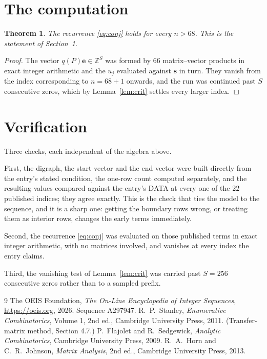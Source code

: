 \documentclass[11pt,a4paper]{article}
\theoremstyle{plain}
\newtheorem{theorem}{Theorem}
\theoremstyle{definition}
\begin{document}
\section{The computation}

\begin{theorem}
The recurrence \eqref{eq:conj} holds for every $n>68$. This is the statement of
Section~1.
\end{theorem}

\begin{proof}
The vector $q(P)\mathbf{e}\in\mathbb{Z}^{S}$ was formed by $66$ matrix--vector
products in exact integer arithmetic and the $u_j$ evaluated against $\mathbf{s}$ in turn.
They vanish from the index corresponding to $n=68+1$ onwards, and the run was continued
past $S$ consecutive zeros, which by Lemma~\ref{lem:crit} settles every larger index.
\end{proof}

\section{Verification}

Three checks, each independent of the algebra above.

First, the digraph, the start vector and the end vector were built directly from the
entry's stated condition, the one-row count computed separately, and the resulting values
compared against the entry's DATA at every one of the $22$ published indices; they
agree exactly. This is the check that ties the model to the sequence, and it is a sharp one:
getting the boundary rows wrong, or treating them as interior rows, changes the early terms
immediately.

Second, the recurrence \eqref{eq:conj} was evaluated on those published terms in exact
integer arithmetic, with no matrices involved, and vanishes at every index the entry claims.

Third, the vanishing test of Lemma~\ref{lem:crit} was carried past $S=256$ consecutive
zeros rather than to a sampled prefix.

\begin{thebibliography}{9}
 The OEIS Foundation, \emph{The On-Line Encyclopedia of Integer
Sequences}, \url{https://oeis.org}, 2026. Sequence A297947.
 R.~P.~Stanley, \emph{Enumerative Combinatorics}, Volume 1, 2nd ed.,
Cambridge University Press, 2011. (Transfer-matrix method, Section 4.7.)
 P.~Flajolet and R.~Sedgewick, \emph{Analytic Combinatorics}, Cambridge
University Press, 2009.
 R.~A.~Horn and C.~R.~Johnson, \emph{Matrix Analysis}, 2nd ed., Cambridge
University Press, 2013.
\end{thebibliography}
\end{document}
